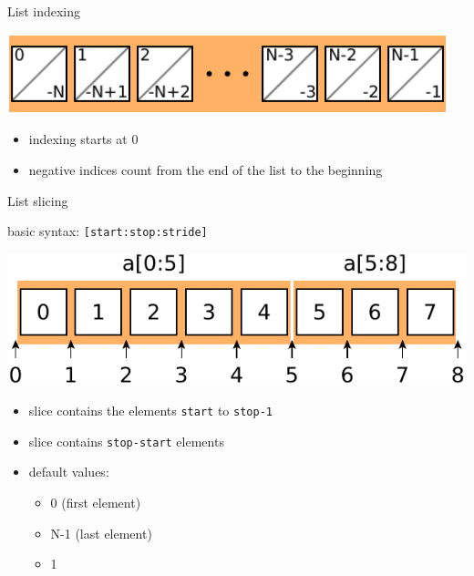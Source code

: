 \documentclass[svgnames]{beamer}
\begin{document}
\begin{frame}{List indexing}
 \begin{center}
  \includegraphics[width=0.96\textwidth]{listindexing2}
 \end{center}
 \begin{itemize}
  \item indexing starts at 0
  \item negative indices count from the end of the list to the beginning
 \end{itemize}
\end{frame}

\begin{frame}{List slicing}

 basic syntax: \texttt{[start:stop:stride]}

 \vspace{0.2truecm}
 \begin{center}
  \includegraphics[width=\textwidth]{listindexing1}
 \end{center}
 \begin{itemize}
  \item slice contains the elements \texttt{start} to \texttt{stop-1}
  \item slice contains \texttt{stop-start} elements
  \item default values:
  \begin{itemize}
      \item {} 0 (first element)
      \item {} N-1 (last element)
      \item {} 1
  \end{itemize}
 \end{itemize}
\end{frame}
\end{document}
